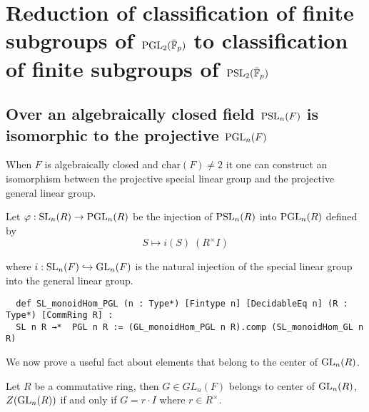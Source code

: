 \chapter{Reduction of classification of finite subgroups of $\operatorname{PGL}_2(\bar{\mathbb{F}}_p)$ to classification of finite subgroups of $\operatorname{PSL}_2(\bar{\mathbb{F}}_p)$}\label{Ch4_ReductionOfProblem}

\section{Over an algebraically closed field $\operatorname{PSL}_n(F)$ is isomorphic to the projective $\operatorname{PGL}_n(F)$}


When $F$ is algebraically closed and $\textrm{char}(F) \neq 2$ it one can construct an isomorphism between 
the projective special linear group and the projective general linear group.

\begin{definition}
\label{SL_monoidHom_PGL}
\leanok
    Let $\varphi : \operatorname{SL}_n(R) \rightarrow \operatorname{PGL}_n(R)$ be the injection of $\operatorname{PSL}_n(R)$ into $\operatorname{PGL}_n(R)$ defined by
    \[
     S \mapsto i(S) \;  (R^\times I) 
    \]

    where $i : \operatorname{SL}_n(F) \hookrightarrow \operatorname{GL}_n(F)$ is the natural injection of the special linear group into the general linear group.
\end{definition}
\begin{footnotesize}
\begin{verbatim}
  def SL_monoidHom_PGL (n : Type*) [Fintype n] [DecidableEq n] (R : Type*) [CommRing R] :
  SL n R →*  PGL n R := (GL_monoidHom_PGL n R).comp (SL_monoidHom_GL n R)
\end{verbatim}
\end{footnotesize}


We now prove a useful fact about elements that belong to the center of $\operatorname{GL}_n(R)$.

\begin{lemma}
    \label{GeneralLinearGroup.mem_center_general_linear_group_iff}
    \leanok
     Let $R$ be a commutative ring, then $G \in GL_n(F)$ belongs to center of $\operatorname{GL}_n(R)$, $Z(\operatorname{GL}_n(R))$ if and only if $G = r \cdot I$ where $r \in R^\times$.
    \end{lemma}
    
